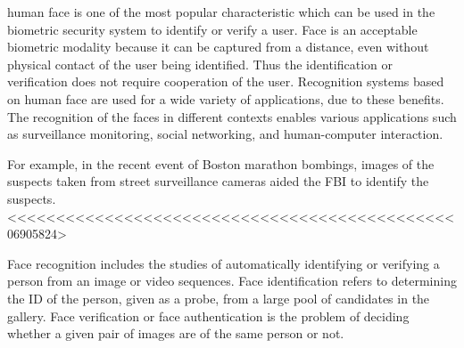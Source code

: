 % 
% 
% 
% 

 human face is one of the most popular
characteristic which can be used in the biometric security system
to identify or verify a user. Face is an acceptable biometric
modality because it can be captured from a distance, even
without physical contact of the user being identified. Thus the
identification or verification does not require cooperation of the
user. Recognition systems based on human face are used for a
wide variety of applications, due to these benefits.\cite{Eurocon}
The recognition of the faces in different contexts
enables various applications such as surveillance monitoring,
social networking, and human-computer interaction.\cite{Forensics}


For example, in the recent event of Boston marathon bombings,
images of the suspects taken from street surveillance cameras
aided the FBI to identify the suspects.
<<<<<<<<<<<<<<<<<<<<<<<<<<<<<<<<<<<<<<<<<<<<<<06905824>
 

Face recognition includes the studies of automatically
identifying or verifying a person from an image or video
sequences. Face identification refers to determining the ID of
the person, given as a probe, from a large pool of candidates
in the gallery. Face verification or face authentication is the problem of deciding whether a given pair of images are
of the same person or not\cite{Forensics}.

